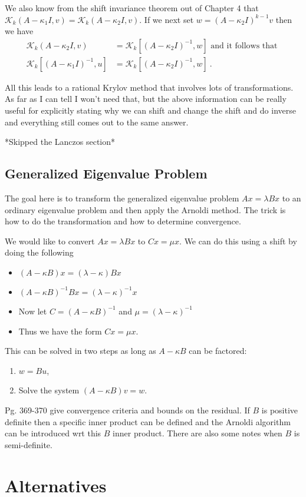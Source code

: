 \documentclass[12pt,twoside]{article}
\newcommand{\eval}{eigenvalue }
\newcommand{\cl}[1]{\ensuremath{\mathcal{#1}}}
\begin{document}
We also know from the shift invariance theorem out of Chapter 4 that $\cl{K}_{k}(A - \kappa_{1}I, v) = \cl{K}_{k}(A - \kappa_{2}I, v)$. If we next set $w = (A - \kappa_{2}I)^{k-1}v$ then we have
\begin{align}
 \cl{K}_{k}(A - \kappa_{2}I, v) &= \cl{K}_{k}[(A - \kappa_{2}I)^{-1}, w] \text{ and it follows that } \\
 \cl{K}_{k}[(A - \kappa_{1}I)^{-1}, u] &= \cl{K}_{k}[(A - \kappa_{2}I)^{-1}, w] \:.
\end{align}

All this leads to a rational Krylov method that involves lots of transformations. As far as I can tell I won't need that, but the above information can be really useful for explicitly stating why we can shift and change the shift and do inverse and everything still comes out to the same answer. 

*Skipped the Lanczos section*

\subsection{Generalized Eigenvalue Problem}
The goal here is to transform the generalized \eval problem $Ax = \lambda Bx$ to an ordinary \eval problem and then apply the Arnoldi method. The trick is how to do the transformation and how to determine convergence. 

We would like to convert $Ax = \lambda Bx$ to $Cx = \mu x$. We can do this using a shift by doing the following
\begin{itemize}
  \item $(A - \kappa B)x = (\lambda - \kappa)Bx$
  \item $(A- \kappa B)^{-1}Bx = (\lambda - \kappa)^{-1}x$
  \item Now let $C = (A - \kappa B)^{-1}$ and $\mu = (\lambda - \kappa)^{-1}$
  \item Thus we have the form $Cx = \mu x$.
\end{itemize}
This can be solved in two steps as long as $A - \kappa B$ can be factored: 
\begin{enumerate}
  \item $w = Bu$, 
  \item Solve the system $(A - \kappa B)v = w$.
\end{enumerate}
 Pg. 369-370 give convergence criteria and bounds on the residual. If $B$ is positive definite then a specific inner product can be defined and the Arnoldi algorithm can be introduced wrt this $B$ inner product. There are also some notes when $B$ is semi-definite. 

\section{Alternatives}

 
\end{document}
